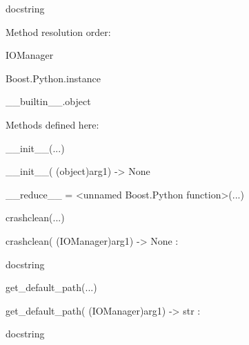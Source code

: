 \documentclass[letterpaper,10pt,english]{sphinxmanual}
\begin{document}
\begin{description}
\begin{description}
\item[{class IOManager(Boost.Python.instance)}] \leavevmode
\begin{DUlineblock}{0em}
\item[] docstring
\item[] 
\item[] Method resolution order:
\item[]
\begin{DUlineblock}{\DUlineblockindent}
\item[] IOManager
\item[] Boost.Python.instance
\item[] \_\_builtin\_\_.object
\item[] 
\end{DUlineblock}
\item[] Methods defined here:
\item[] 
\item[] \_\_init\_\_(...)
\item[]
\begin{DUlineblock}{\DUlineblockindent}
\item[] \_\_init\_\_( (object)arg1) -\textgreater{} None
\item[] 
\end{DUlineblock}
\item[] \_\_reduce\_\_ = \textless{}unnamed Boost.Python function\textgreater{}(...)
\item[] 
\item[] crashclean(...)
\item[]
\begin{DUlineblock}{\DUlineblockindent}
\item[] crashclean( (IOManager)arg1) -\textgreater{} None :
\item[]
\begin{DUlineblock}{\DUlineblockindent}
\item[] docstring
\item[] 
\end{DUlineblock}
\end{DUlineblock}
\item[] get\_default\_path(...)
\item[]
\begin{DUlineblock}{\DUlineblockindent}
\item[] get\_default\_path( (IOManager)arg1) -\textgreater{} str :
\item[]
\begin{DUlineblock}{\DUlineblockindent}
\item[] docstring

\end{DUlineblock}
\end{DUlineblock}
\end{DUlineblock}
\end{description}
\end{description}
\end{document}
